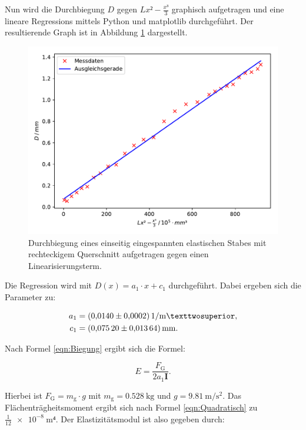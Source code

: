 Nun wird die Durchbiegung $D$ gegen $Lx²-\frac{x³}{3}$ graphisch aufgetragen
und eine lineare Regressions mittels Python und matplotlib durchgeführt.
Der resultierende Graph ist in Abbildung \ref{fig:plot1} dargestellt.

\begin{figure}
  \centering
  \includegraphics[scale=0.8]{content/plot1.pdf}
  \caption{Durchbiegung eines einseitig eingespannten elastischen Stabes mit rechteckigem Querschnitt aufgetragen
  gegen einen Linearisierungsterm.}
  \label{fig:plot1}
\end{figure}

Die Regression wird mit $D(x) = a_1\cdot x + c_1$ durchgeführt. Dabei ergeben 
sich die Parameter zu: 

\begin{align*}
a_1 &= \SI{0.0140+-0.0002}{1\per\meter²},\\
c_1 &= \SI{0.0752+-0.01364}{\milli\meter}.
\end{align*}

Nach Formel \eqref{eqn:Biegung} ergibt sich die Formel: 

\begin{equation*}
E = \frac{F_\text{G}}{2a_1\symbf{I}}.
\end{equation*}

Hierbei ist $F_\text{G} = m_\text{g}\cdot g$ mit $m_\text{g} = \SI{0.528}{\kilo\gram}$
und $g = \SI{9.81}{\meter\per\second\squared}$. Das Flächenträgheitsmoment
ergibt sich nach Formel \eqref{eqn:Quadratisch} zu $\frac{1}{12}\SI{e-8}{\meter⁴}$. 
Der Elastizitätsmodul ist also gegeben durch: 

